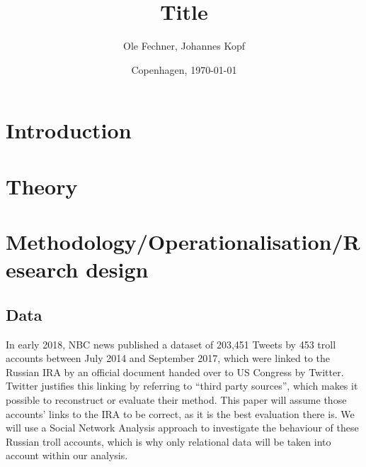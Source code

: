 \documentclass[12pt, titlepage=true, toc=bib]{scrartcl}
\begin{document}
\titlehead{}
\author{Ole Fechner, Johannes Kopf}
\title{Title}


\date{\normalsize{Copenhagen, \today}}

\publishers{}

\maketitle[0]

\newpage

\thispagestyle{empty}
\tableofcontents

\newpage
\setcounter{page}{1}

\section{Introduction}

\section{Theory}

\section{Methodology/Operationalisation/Research design}

\subsection{Data}

In early 2018, NBC news published a dataset of 203,451 Tweets by 453 troll accounts between July 2014 and September 2017, which were linked to the Russian IRA by an official document handed over to US Congress by Twitter. Twitter justifies this linking by referring to “third party sources”, which makes it possible to reconstruct or evaluate their method. This paper will assume those accounts’ links to the IRA to be correct, as it is the best evaluation there is. We will use a Social Network Analysis approach to investigate the behaviour of these Russian troll accounts, which is why only relational data will be taken into account within our analysis.
 
\end{document}
